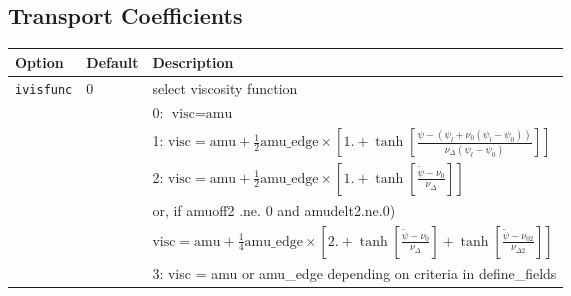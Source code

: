 \subsection{Transport Coefficients}

\begin{tabular}{llp{4.0in}}
  \textbf{Option}&\textbf{Default}&\textbf{Description}\\
  \hline
  \texttt{ivisfunc} & 0 & select viscosity function \\
                    &   & 0: $ \mbox{visc} = \mbox{amu} $ \\
                    &   & 1: $ \mbox{visc} = \mbox{amu} + \frac{1}{2} \mbox{amu\_edge} \times
                 \left[ 1. + \tanh \left[   \frac{\psi - \left( \psi_l+\nu_0(\psi_l - \psi_0)\right)}
                                                 {\nu_{\Delta} (\psi_l - \psi_0)                   }\right] \right] $  \\
                    &   & 2:  $ \mbox{visc} = \mbox{amu} + \frac{1}{2} \mbox{amu\_edge} \times
                 \left[ 1. + \tanh \left[   \frac{\tilde{\psi} - \nu_0}
                                                 {\nu_{\Delta}}  \right] \right] $  \\
                    &   & or, if amuoff2 .ne. 0 and amudelt2.ne.0) \\ 
                    &   &    $ \mbox{visc} = \mbox{amu} + \frac{1}{4} \mbox{amu\_edge} \times
                     \left[ 2. + \tanh \left[   \frac{\tilde{\psi} - \nu_0}
                                                 {\nu_{\Delta}}  \right]                     
                               + \tanh \left[   \frac{\tilde{\psi} - \nu_{02} }
                                                 {\nu_{\Delta2}}  \right]    \right] $  \\
                    &   & 3:  visc = amu or amu\_edge depending on criteria in define\_fields \\


\end{tabular}
